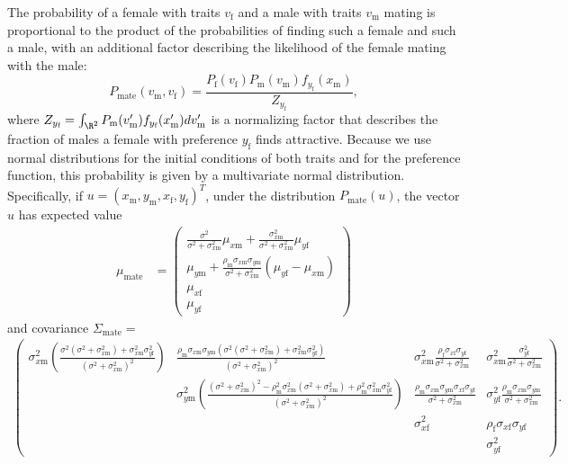 \documentclass[12pt]{article}
\newcommand{\x}[1]{\text{#1}}
\begin{document}
The probability of a female with traits $v_\x{f}$ and a male with traits $v_\x{m}$  mating is proportional to the product of the probabilities of finding such a female and such a male, with an additional factor describing the likelihood of the female mating with the male:
\begin{equation} \label{model}
P_\x{mate}(v_\x{m},v_\x{f})=\frac{P_\x{f}(v_\x{f})P_\x{m}(v_\x{m})f_{y_\x{f}}(x_\x{m})}{Z_{y_\x{f}}},
\end{equation}
where $Z_{y_\x{f}}=\int_{\R^2} P_\x{m}(v_\x{m}')f_{y_\x{f}}(x_\x{m}')dv_\x{m}'$ is a normalizing factor that describes the fraction of males a female with preference $y_\x{f}$ finds attractive.  Because we use normal distributions for the initial conditions of both traits and for the preference function, this probability is given by a multivariate normal distribution. Specifically, if $u=(x_\x{m},y_\x{m},x_\x{f},y_\x{f})^T$, under the distribution $P_\text{mate}(u)$, the vector $u$ has expected value 
\begin{align}
\mu_\text{mate}&=\left(\begin{array}{cc} \frac{\sigma^2}{\sigma^2+\sigma_{x\x{m}}^2}\mu_{x\x{m}}+\frac{\sigma_{x\x{m}}^2}{\sigma^2+\sigma_{x\x{m}}^2}\mu_{y\x{f}} 
\\ \mu_{y\x{m}}+\frac{\rho_\x{m}\sigma_{x\x{m}}\sigma_{y\x{m}}}{\sigma^2+\sigma_{x\x{m}}^2}(\mu_{y\x{f}}-\mu_{x\x{m}})
\\ \mu_{x\x{f}}
\\ \mu_{y\x{f}}
 \end{array}\right) \label{mean}
\end{align}
and covariance $\Sigma_\text{mate}=$
\begin{align}
\left(\begin{array}{cccc}\sigma_{x\x{m}}^2\left(\frac{\sigma^2(\sigma^2+\sigma_{x\x{m}}^2)+\sigma_{x\x{m}}^2\sigma_{y\x{f}}^2}{(\sigma^2+\sigma_{x\x{m}}^2)^2}\right) & \frac{\rho_\x{m}\sigma_{x\x{m}}\sigma_{y\x{m}}(\sigma^2(\sigma^2+\sigma_{x\x{m}}^2)+\sigma_{x\x{m}}^2\sigma_{y\x{f}}^2)}{(\sigma^2+\sigma_{x\x{m}}^2)^2} & \sigma_{x\x{m}}^2\frac{\rho_\x{f}\sigma_{x\x{f}}\sigma_{y\x{f}}}{\sigma^2+\sigma_{x\x{m}}^2} &  \sigma_{x\x{m}}^2\frac{\sigma_{y\x{f}}^2}{\sigma^2+\sigma_{x\x{m}}^2}
\\ & \sigma_{y\x{m}}^2\left(\frac{(\sigma^2+\sigma_{x\x{m}}^2)^2-\rho_\x{m}^2\sigma_{x\x{m}}^2(\sigma^2+\sigma_{x\x{m}}^2)+\rho_\x{m}^2\sigma_{x\x{m}}^2\sigma_{y\x{f}}^2}{(\sigma^2+\sigma_{x\x{m}}^2)^2}\right) & \frac{\rho_\x{m}\sigma_{x\x{m}}\sigma_{y\x{m}}\sigma_{x\x{f}}\sigma_{y\x{f}}}{\sigma^2+\sigma_{x\x{m}}^2}& \sigma_{y\x{f}}^2\frac{\rho_\x{m}\sigma_{x\x{m}}\sigma_{y\x{m}}}{\sigma^2+\sigma_{x\x{m}}^2}
\\ & & \sigma_{x\x{f}}^2 & \rho_\x{f}\sigma_{x\x{f}}\sigma_{y\x{f}}
\\ & & & \sigma_{y\x{f}}^2
\end{array}\right). \label{covariance}
\end{align}
\end{document}
